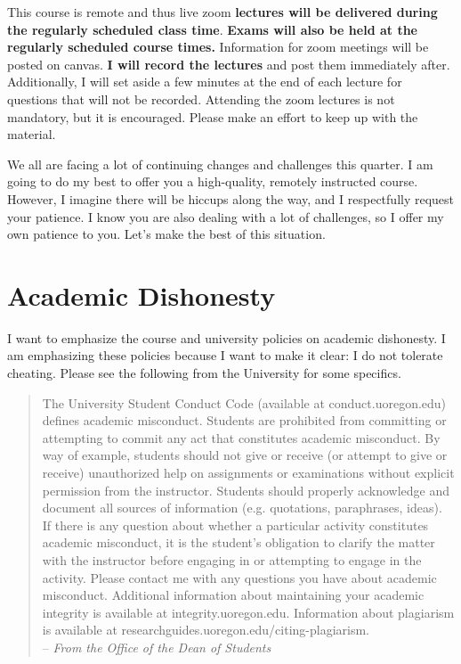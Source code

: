 \documentclass[11pt]{article}
\begin{document}
This course is remote and thus live zoom\textbf{ lectures will be delivered during the regularly scheduled class time}. \textbf{Exams will also be held at the regularly scheduled course times.} Information for zoom meetings will be posted on canvas. \textbf{I will record the lectures} and post them immediately after. Additionally, I will set aside a few minutes at the end of each lecture for questions that will not be recorded. Attending the zoom lectures is not mandatory, but it is encouraged. Please make an effort to keep up with the material.
	
We all are facing a lot of continuing changes and challenges this quarter. I am going to do my best to offer you a high-quality, remotely instructed course. However, I imagine there will be hiccups along the way, and I respectfully request your patience. I know you are also dealing with a lot of challenges, so I offer my own patience to you. Let's make the best of this situation.



\section*{Academic Dishonesty}
 I want to emphasize the course and university policies on academic dishonesty. I am emphasizing these policies because I want to make it clear: I do not tolerate cheating.   Please see the following from the University for some specifics.
	
	
\begin{quote}

The University Student Conduct Code (available at conduct.uoregon.edu) defines academic misconduct. Students are prohibited from committing or attempting to commit any act that constitutes academic misconduct. By way of example, students should not give or receive (or attempt to give or receive) unauthorized help on assignments or examinations without explicit permission from the instructor. Students should properly acknowledge and document all sources of information (e.g. quotations, paraphrases, ideas).\\

 If there is any question about whether a particular activity constitutes academic misconduct, it is the student’s obligation to clarify the matter with the instructor before engaging in or attempting to engage in the activity. Please contact me with any questions you have about academic misconduct.
	Additional information about maintaining your academic integrity is available at integrity.uoregon.edu. Information about plagiarism is available at researchguides.uoregon.edu/citing-plagiarism.\\
	
	
	\hspace{3in }-- \textit{From the Office of the Dean of Students}

\end{quote}
\end{document}
